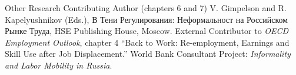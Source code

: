 
\def\arraystretch{1.3}

\begin{rubric}{Other Research}
\entry*[2014] Contributing Author (chapters 6 and 7) \newline
          V. Gimpelson and R. Kapelyushnikov (Eds.), \foreignlanguage{russian}{В Тени Регулирования: Неформальност на Российском Рынке Труда}, HSE Publishing House, Moscow.
\entry*[2013] External Contributor to \emph{OECD Employment Outlook}, chapter 4 \newline
               ``Back to Work: Re-employment, Earnings and Skill Use after Job Displacement.''
\entry*[2012] World Bank Consultant \newline
             Project: \emph{Informality and Labor Mobility in Russia}.
\end{rubric}
